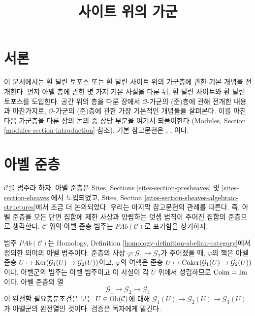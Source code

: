 

%


\title{사이트 위의 가군}


\maketitle

\label{section-phantom}

\tableofcontents

\section{서론}
\label{section-introduction}

\noindent
이 문서에서는 환 달린 토포스 또는 환 달린 사이트 위의 가군층에 관한
기본 개념을 전개한다. 먼저 아벨 층에 관한 몇 가지 기본 사실을 다룬 뒤,
환 달린 사이트와 환 달린 토포스를 도입한다. 공간 위의 층을 다룬 장에서
$\mathcal{O}$-가군의 (준)층에 관해 전개한 내용과 마찬가지로,
$\mathcal{O}$-가군의 (준)층에 관한 가장 기본적인 개념들을 살펴본다.
이를 마친 다음 가군층을 다룬 장의 논의 중 상당 부분을 여기서 되풀이한다
(Modules, Section \ref{modules-section-introduction} 참조).
기본 참고문헌은 \cite{FAC}, \cite{EGA}, \cite{SGA4}이다.






\section{아벨 준층}
\label{section-abelian-pre-sheaves}

\noindent
$\mathcal{C}$를 범주라 하자.
아벨 준층은 Sites, Sections \ref{sites-section-presheaves} 및
\ref{sites-section-sheaves}에서 도입되었고, Sites, Section
\ref{sites-section-sheaves-algebraic-structures}에서 조금 더 논의되었다.
우리는 마지막 참고문헌의 관례를 따른다. 즉, 아벨 준층을 모든 단면 집합에
제한 사상과 양립하는 덧셈 법칙이 주어진 집합의 준층으로 생각한다.
$\mathcal{C}$ 위의 아벨 준층 범주는
$\textit{PAb}(\mathcal{C})$로 표기함을 상기하자.

\medskip\noindent
범주 $\textit{PAb}(\mathcal{C})$는 Homology, Definition
\ref{homology-definition-abelian-category}에서 정의한 의미의 아벨 범주이다.
준층의 사상 $\varphi : \mathcal{G}_1 \to \mathcal{G}_2$가 주어졌을 때,
$\varphi$의 핵은 아벨 준층
$U \mapsto \mathop{\mathrm{Ker}}(\mathcal{G}_1(U) \to \mathcal{G}_2(U))$이고,
$\varphi$의 여핵은 준층
$U \mapsto \mathop{\mathrm{Coker}}(\mathcal{G}_1(U) \to \mathcal{G}_2(U))$이다.
아벨군의 범주는 아벨 범주이고 이 사실이 각 $U$ 위에서 성립하므로
$\mathop{\mathrm{Coim}} = \mathop{\mathrm{Im}}$이다. 아벨 준층의 열
$$
\mathcal{G}_1 \longrightarrow
\mathcal{G}_2 \longrightarrow
\mathcal{G}_3
$$
이 완전할 필요충분조건은 모든 $U \in \mathop{\mathrm{Ob}}\nolimits(\mathcal{C})$에 대해
$\mathcal{G}_1(U) \to \mathcal{G}_2(U) \to \mathcal{G}_3(U)$가
아벨군의 완전열인 것이다. 검증은 독자에게 맡긴다.

